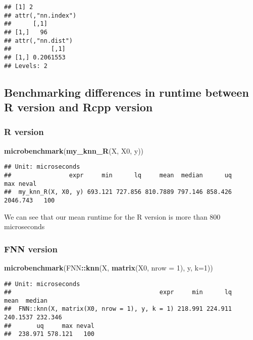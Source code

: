 \documentclass[]{article}
\newenvironment{Shaded}{\begin{snugshade}}{\end{snugshade}}
\newcommand{\DataTypeTok}[1]{\textcolor[rgb]{0.13,0.29,0.53}{#1}}
\newcommand{\DecValTok}[1]{\textcolor[rgb]{0.00,0.00,0.81}{#1}}
\newcommand{\KeywordTok}[1]{\textcolor[rgb]{0.13,0.29,0.53}{\textbf{#1}}}
\newcommand{\NormalTok}[1]{#1}
\newcommand{\OperatorTok}[1]{\textcolor[rgb]{0.81,0.36,0.00}{\textbf{#1}}}
\begin{document}
\begin{verbatim}
## [1] 2
## attr(,"nn.index")
##      [,1]
## [1,]   96
## attr(,"nn.dist")
##           [,1]
## [1,] 0.2061553
## Levels: 2
\end{verbatim}

\hypertarget{benchmarking-differences-in-runtime-between-r-version-and-rcpp-version}{%
\subsection{Benchmarking differences in runtime between R version and
Rcpp
version}\label{benchmarking-differences-in-runtime-between-r-version-and-rcpp-version}}

\hypertarget{r-version}{%
\subsubsection{R version}\label{r-version}}

\begin{Shaded}
\begin{Highlighting}[]
\KeywordTok{microbenchmark}\NormalTok{(}\KeywordTok{my_knn_R}\NormalTok{(X, X0, y))}
\end{Highlighting}
\end{Shaded}

\begin{verbatim}
## Unit: microseconds
##                expr     min      lq     mean  median      uq      max neval
##  my_knn_R(X, X0, y) 693.121 727.856 810.7889 797.146 858.426 2046.743   100
\end{verbatim}

We can see that our mean runtime for the R version is more than 800
microseconds

\hypertarget{fnn-version}{%
\subsubsection{FNN version}\label{fnn-version}}

\begin{Shaded}
\begin{Highlighting}[]
\KeywordTok{microbenchmark}\NormalTok{(FNN}\OperatorTok{::}\KeywordTok{knn}\NormalTok{(X, }\KeywordTok{matrix}\NormalTok{(X0, }\DataTypeTok{nrow =} \DecValTok{1}\NormalTok{), y, }\DataTypeTok{k=}\DecValTok{1}\NormalTok{))}
\end{Highlighting}
\end{Shaded}

\begin{verbatim}
## Unit: microseconds
##                                         expr     min      lq     mean  median
##  FNN::knn(X, matrix(X0, nrow = 1), y, k = 1) 218.991 224.911 240.1537 232.346
##       uq     max neval
##  238.971 578.121   100
\end{verbatim}
\end{document}
